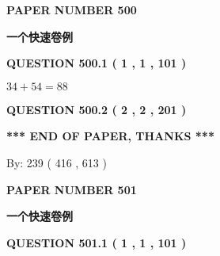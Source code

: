 \documentclass{ctexart}
\begin{document}
   
 {\textbf{ \Large{ PAPER NUMBER  500  }}}
   
   
\vspace{0.2in}
   
   
   
   
   
   
 \vspace{0.2in}
{\LARGE {\textbf{ 一个快速卷例}}}
   
   
  
\vspace{0.2in}
  
{\textbf{\Large{QUESTION
500.1 
 ( 1 , 1 , 101 )
}}}
  
  
 
 

$ %
34 +  %
54=   %
88$
 
 
  
\vspace{0.2in}
  
{\textbf{\Large{QUESTION
500.2 
 ( 2 , 2 , 201 )
}}}
  
  
   
   
 \vspace{0.2in}
 
   
   
   
   
\vspace{1.0in} 
{\textbf{\large{ *** END OF PAPER, THANKS *** }}} 
   
   
\hspace{1.0in} By: 
 239 ( 416 ,  613 )
   
   
   
   
\newpage 
\setcounter{page}{ 
   501001 } 
   
   
   
   
 {\textbf{ \Large{ PAPER NUMBER  501  }}}
   
   
\vspace{0.2in}
   
   
   
   
   
   
 \vspace{0.2in}
{\LARGE {\textbf{ 一个快速卷例}}}
   
   
  
\vspace{0.2in}
  
{\textbf{\Large{QUESTION
501.1 
 ( 1 , 1 , 101 )
}}}
  
\end{document}
